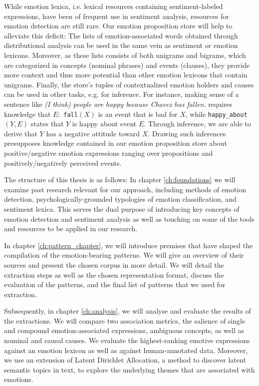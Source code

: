 While emotion lexica, i.e. lexical resources containing sentiment-labeled expressions, have been of frequent use in sentiment analysis, resources for emotion detection are still rare. Our emotion proposition store will help to alleviate this deficit: The lists of emotion-associated words obtained through distributional analysis can be used in the same vein as sentiment or emotion lexicons. Moreover, as these lists consists of both unigrams and bigrams, which are categorized in concepts (nominal phrases) and events (clauses), they provide more context and thus more potential than other emotion lexicons that contain unigrams. Finally, the store's tuples of contextualized emotion holders and causes can be used in other tasks, e.g. for inference. For instance, making sense of a sentence like \textit{(I think) people are happy because Chavez has fallen.} \cite{benefactive_malefactive} requires knowledge that $E:$ \texttt{fall}$(X)$ is an event that is bad for $X$, while \texttt{happy\_about}$(Y, E)$ states that $Y$ is happy about event $E$. Through inference, we are able to derive that $Y$ has a negative attitude toward $X$. Drawing such inferences presupposes knowledge contained in our emotion proposition store about positive/negative emotion expressions ranging over propositions and positively/negatively perceived events.

The structure of this thesis is as follows: In chapter \ref{ch:foundations} we will examine past research relevant for our approach, including methods of emotion detection, psychologically-grounded typologies of emotion classification, and sentiment lexica. This serves the dual purpose of introducing key concepts of emotion detection and sentiment analysis as well as touching on some of the tools and resources to be applied in our research.

In chapter \ref{ch:pattern_chapter}, we will introduce premises that have shaped the compilation of the emotion-bearing patterns. We will give an overview of their sources and present the chosen corpus in more detail. We will detail the extraction steps as well as the chosen representation format, discuss the evaluation of the patterns, and the final list of patterns that we used for extraction.

Subsequently, in chapter \ref{ch:analysis}, we will analyse and evaluate the results of the extractions. We will compare two association metrics, the salience of single and compound emotion-associated expressions, ambiguous concepts, as well as nominal and causal causes. We evaluate the highest-ranking emotive expressions against an emotion lexicon as well as against human-annotated data. Moreover, we use an extension of Latent Dirichlet Allocation, a method to discover latent semantic topics in text, to explore the underlying themes that are associated with emotions.

